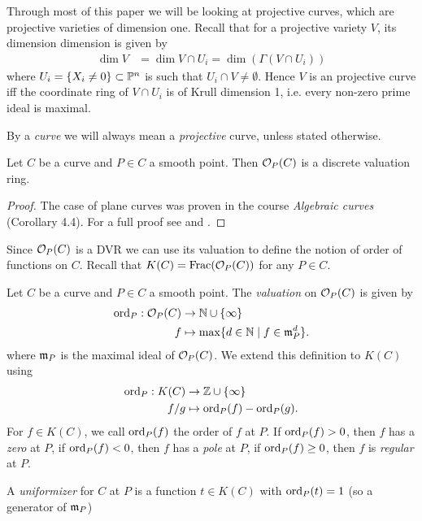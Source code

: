 Through most of this paper we will be looking at projective curves, which
are projective varieties of dimension one. Recall that for a projective
variety $V$, its dimension dimension is given by
\begin{align*}
	\dim V &= \dim V\cap U_i = \dim(\Gamma(V\cap U_i))
\end{align*}
where $U_i = \{X_i \neq 0\} \subset \mathbb{P}^n$ is such that $U_i\cap V\neq
\emptyset$. Hence $V$ is an projective curve iff the coordinate ring
of $V \cap U_i$ is of Krull dimension 1, i.e. every non-zero prime
ideal is maximal.

By a \emph{curve} we will always mean a \emph{projective} curve, unless
stated otherwise.

\begin{proposition}
	Let $C$ be a curve and $P \in C$ a smooth point.
	Then $\mathcal{O}_P(C)$ is a discrete valuation ring.
\end{proposition}

\begin{proof}
	The case of plane curves was proven in the course \emph{Algebraic curves}
	(Corollary 4.4).
	For a full proof see \cite[I.5.1]{hartshorne} and \cite[9.2]{atiyah}.
\end{proof}

Since $\mathcal{O}_P(C)$ is a DVR we can use its valuation to define the
notion of order of functions on $C$. Recall that $K(C) = \operatorname{Frac}(\mathcal{O}_P(C))$ for
any $P \in C$.

\begin{definition}
	Let $C$ be a curve and $P \in C$ a smooth point. The \emph{valuation}
	on $\mathcal{O}_P(C)$ is given by
	\begin{align*}
		\operatorname{ord}_P: \mathcal{O}_P(C) &\to \mathbb{N}\cup\{\infty\}\\
		f &\mapsto \max\{d \in \mathbb{N} \mid f \in \mathfrak{m}_P^d\}.
	\end{align*}
	where $\mathfrak{m}_P$ is the maximal ideal of $\mathcal{O}_P(C)$.
	We extend this definition to $K(C)$ using
	\begin{align*}
		\operatorname{ord}_P: K(C) &\to \mathbb{Z}\cup\{\infty\}\\
		f/g &\mapsto \operatorname{ord}_P(f) - \operatorname{ord}_P(g).
	\end{align*}
	For $f \in K(C)$, we call $\operatorname{ord}_P(f)$ the order of $f$ at $P$.
	If $\operatorname{ord}_P(f) > 0$, then $f$ has a \emph{zero} at $P$,
	if $\operatorname{ord}_P(f) < 0$, then $f$ has a \emph{pole} at $P$,
	if $\operatorname{ord}_P(f) \geq 0$, then $f$ is \emph{regular} at $P$.
	
	A \emph{uniformizer} for $C$ at $P$ is a function $t \in K(C)$ with
	$\operatorname{ord}_P(t) = 1$ (so a generator of $\mathfrak{m}_P$)
\end{definition}

